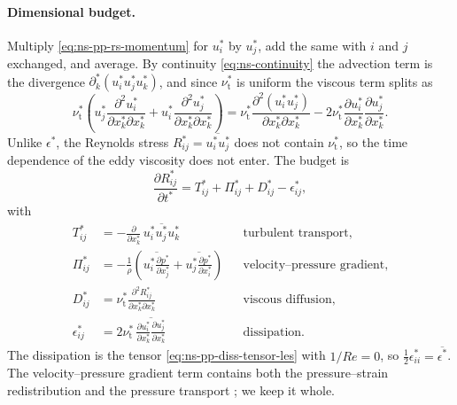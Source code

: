 \documentclass{article}
\begin{document}
\paragraph{Dimensional budget.}
Multiply \eqref{eq:ns-pp-rs-momentum} for $u_i^*$ by $u_j^*$, add the same
with $i$ and $j$ exchanged, and average. By continuity
\eqref{eq:ns-continuity} the advection term is the divergence
$\partial_k^* (u_i^* u_j^* u_k^*)$, and since $\nu_{\mathrm{t}}^*$ is uniform
the viscous term splits as
\begin{equation*}
  \nu_{\mathrm{t}}^* \left( u_j^* \frac{\partial^2 u_i^*}{\partial x_k^* \partial x_k^*}
  + u_i^* \frac{\partial^2 u_j^*}{\partial x_k^* \partial x_k^*} \right)
  = \nu_{\mathrm{t}}^* \frac{\partial^2 (u_i^* u_j^*)}{\partial x_k^* \partial x_k^*}
  - 2 \nu_{\mathrm{t}}^* \frac{\partial u_i^*}{\partial x_k^*} \frac{\partial u_j^*}{\partial x_k^*} .
\end{equation*}
Unlike $\epsilon^*$, the Reynolds stress $R_{ij}^* = \overline{u_i^* u_j^*}$
does not contain $\nu_{\mathrm{t}}^*$, so the time dependence of the eddy
viscosity does not enter. The budget is \cite{pope2000turbulent}
\begin{equation}\label{eq:ns-pp-rs-rate}
  \frac{\partial R_{ij}^*}{\partial t^*}
  = T_{ij}^* + \Pi_{ij}^* + D_{ij}^* - \epsilon_{ij}^* ,
\end{equation}
with
\begin{equation}\label{eq:ns-pp-rs-terms}
\begin{aligned}
  T_{ij}^* &= -\frac{\partial}{\partial x_k^*}\, \overline{u_i^* u_j^* u_k^*}
  && \text{turbulent transport,} \\
  \Pi_{ij}^* &= -\frac{1}{\rho} \left( \overline{u_i^* \frac{\partial p^*}{\partial x_j^*}}
  + \overline{u_j^* \frac{\partial p^*}{\partial x_i^*}} \right)
  && \text{velocity--pressure gradient,} \\
  D_{ij}^* &= \nu_{\mathrm{t}}^* \frac{\partial^2 R_{ij}^*}{\partial x_k^* \partial x_k^*}
  && \text{viscous diffusion,} \\
  \epsilon_{ij}^* &= 2 \nu_{\mathrm{t}}^*\, \overline{\frac{\partial u_i^*}{\partial x_k^*} \frac{\partial u_j^*}{\partial x_k^*}}
  && \text{dissipation.}
\end{aligned}
\end{equation}
The dissipation is the tensor \eqref{eq:ns-pp-diss-tensor-les} with
$1/Re = 0$, so $\tfrac12 \epsilon_{ii}^* = \overline{\epsilon^*}$. The
velocity--pressure gradient term contains both the pressure--strain
redistribution and the pressure transport \cite{pope2000turbulent}; we keep it
whole.
\end{document}
